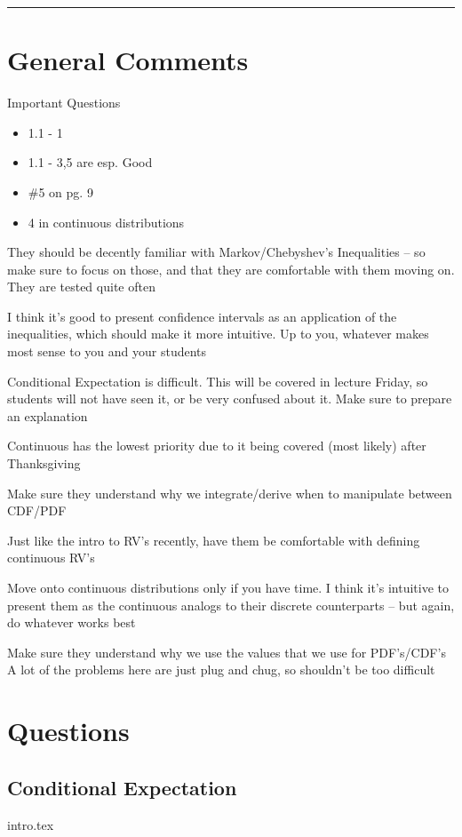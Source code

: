 \documentclass{exam}
\title{}
\date{Distributions, Variance, Inequalities, Confidence Intervals}
\begin{document}
\maketitle
\rule{\textwidth}{0.15em}
\fontsize{12}{15}\selectfont
\thispagestyle{empty}


\section{General Comments}
\begin{questions}
\item Important Questions
\begin{itemize}
\item 1.1 - 1
\item 1.1 - 3,5 are esp. Good
\item \#5 on pg. 9
\item 4 in continuous distributions
\end{itemize}

\item They should be decently familiar with Markov/Chebyshev’s Inequalities – so make sure to focus on those, and that they are comfortable with them moving on. They are tested quite often
\item I think it’s good to present confidence intervals as an application of the inequalities, which should make it more intuitive. Up to you, whatever makes most sense to you and your students
\item Conditional Expectation is difficult. This will be covered in lecture Friday, so students will not have seen it, or be very confused about it. Make sure to prepare an explanation
\item Continuous has the lowest priority due to it being covered (most likely) after Thanksgiving
\item Make sure they understand why we integrate/derive when to manipulate between CDF/PDF
\item Just like the intro to RV’s recently, have them be comfortable with defining continuous RV’s
\item Move onto continuous distributions only if you have time. I think it’s intuitive to present them as the continuous analogs to their discrete counterparts – but again, do whatever works best
\item Make sure they understand why we use the values that we use for PDF’s/CDF’s
A lot of the problems here are just plug and chug, so shouldn’t be too difficult
\end{questions}

\section{Questions}
\subsection{Conditional Expectation}
\begin{enumerate}
{intro.tex}
\end{enumerate}
\end{document}
